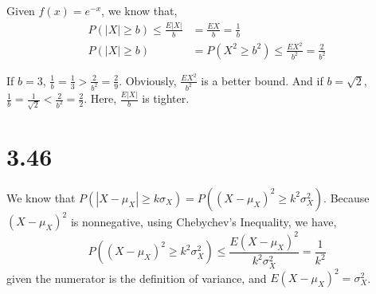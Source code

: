 \documentclass[letter]{article}
\begin{document}
   Given $f(x) = e^{-x}$, we know that,
   \begin{align*}
   P(|X| \ge b) \le \frac{E|X|}{b} & = \frac{EX}{b} = \frac{1}{b} \\
   P(|X| \ge b) & = P(X^2 \ge b^2) \le \frac{EX^2}{b^2} = \frac{2}{b^2}
   \end{align*}

   If $b=3$, $\frac{1}{b} = \frac{1}{3} > \frac{2}{b^2} = \frac{2}{9}$. Obviously, $\frac{EX^2}{b^2}$ is a better bound. And if $b = \sqrt{2}$, $\frac{1}{b} = \frac{1}{\sqrt{2}} < \frac{2}{b^2} = \frac{2}{2}$. Here, $\frac{E|X|}{b}$ is tighter.

   \section*{3.46}
    We know that $P(|X-\mu_X| \ge k\sigma_X) = P\left((X-\mu_X)^2 \ge k^2 \sigma_X^2\right)$. Because $(X-\mu_X)^2$ is nonnegative, using Chebychev's Inequality, we have,
    \[
    P\left((X-\mu_X)^2 \ge k^2 \sigma_X^2\right) \le \frac{E(X-\mu_X)^2}{k^2 \sigma_X^2} = \frac{1}{k^2}
    \]
    given the numerator is the definition of variance, and $E(X - \mu_X)^2 = \sigma_X^2$.
    
    
\end{document}
